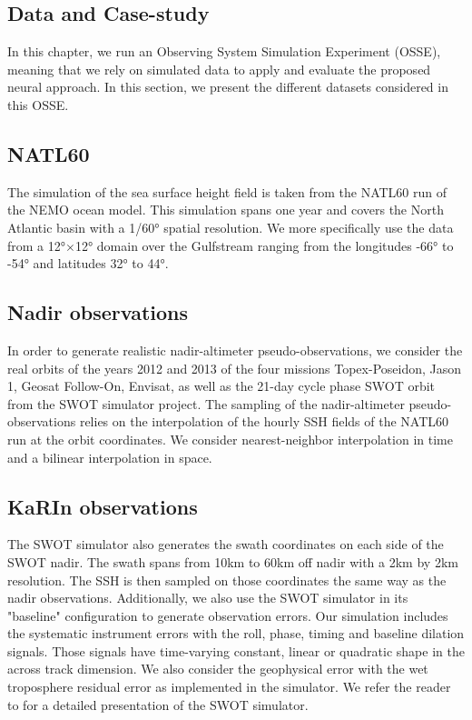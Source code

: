 \begin{bibunit}
\section{Data and Case-study}
\label{c3sec:case_study}
In this chapter, we run an Observing System Simulation Experiment (OSSE), meaning that we rely on simulated data to apply and evaluate the proposed neural approach.
In this section, we present the different datasets considered in this OSSE.



\subsection*{NATL60}
The simulation of the sea surface height field is taken from the NATL60 \cite{ajayi_spatial_2020} run of the NEMO ocean model. This simulation spans one year and covers the North Atlantic basin with a 1/60° spatial resolution. We more specifically use the data from a 12°$\times$12° domain over the Gulfstream ranging from the longitudes -66° to -54° and latitudes 32° to 44°.


\subsection*{Nadir observations}
\label{c3subsec:altimetry}


In order to generate realistic nadir-altimeter pseudo-observations, we consider the real orbits of the years 2012 and 2013 of the four missions Topex-Poseidon, Jason 1, Geosat Follow-On, Envisat, as well as the 21-day cycle phase SWOT orbit from the SWOT simulator \cite{ubelmann_swot_nodate} project. The sampling of the nadir-altimeter pseudo-observations relies on the interpolation of the hourly SSH fields of the NATL60 run at the orbit coordinates. We consider nearest-neighbor interpolation in time and a bilinear interpolation in space.


\subsection*{KaRIn observations}
The SWOT simulator also generates the swath coordinates on each side of the SWOT nadir. The swath spans from 10km to 60km off nadir with a 2km by 2km resolution. The SSH is then sampled on those coordinates the same way as the nadir observations.
Additionally, we also use the SWOT simulator in its "baseline" configuration to generate observation errors. 
Our simulation includes the systematic instrument errors with the roll, phase, timing and baseline dilation signals. Those signals have time-varying constant, linear or quadratic shape in the across track dimension. 
We also consider the geophysical error with the wet troposphere residual error as implemented in the simulator. 
We refer the reader to \cite{ubelmann_swot_nodate}
for a detailed presentation of the SWOT simulator.


\end{bibunit}
